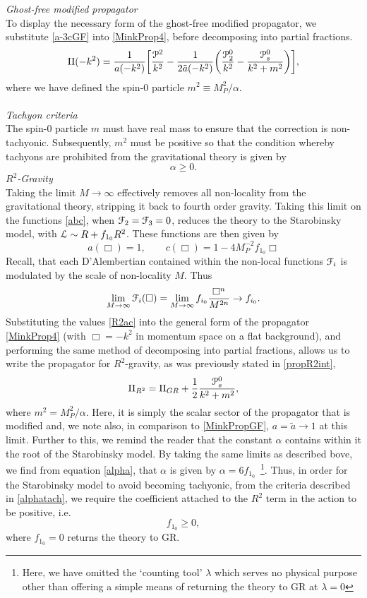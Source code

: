 \\\\
\emph{Ghost-free modified propagator}
\\
To display the necessary form of the ghost-free modified propagator, we substitute \eqref{a-3cGF} into \eqref{MinkProp4}, before decomposing into partial fractions.
\[
\label{MinkPropGF}
\Pi(-k^2)=\frac{1}{a(-k^2)}\biggl[\frac{{\cal P}^2}{k^2}-\frac{1}{2{\tilde a}(-k^2)}\biggl(\frac{{\cal P}_2^0}{k^2}-\frac{{\cal P}_s^0}{k^2+m^2}\biggr)\biggr]
,\]
where we have defined the spin-0 particle $m^2\equiv M_P^2/\alpha$. 
\pagebreak
\\\\\emph{Tachyon criteria}
\\
The spin-0 particle $m$ must have real mass to ensure that the correction is non-tachyonic. Subsequently, $m^2$ must be positive so that the condition whereby tachyons are prohibited from the gravitational theory is given by
\[
\label{alphatach}
\alpha\geq0
.\]
\emph{$R^2$-Gravity}
\\
Taking the limit $M\rightarrow\infty$ effectively removes all non-locality from the gravitational theory, stripping it back to fourth order gravity. Taking this limit on the functions \eqref{abc}, when ${\cal F}_2={\cal F}_3=0$, reduces the theory to the Starobinsky model, with ${\cal L}\sim R+f_{1_0} R^2$. These functions are then given by
\[
\label{R2ac}
a(\Box)=1, \qquad c(\Box)=1-4M_P^{-2}f_{1_0}\Box
\]
Recall, that each D'Alembertian contained within the non-local functions ${\cal F}_i$ is modulated by the scale of non-locality $M$. Thus
\[
\lim_{M\rightarrow\infty} {\cal F}_i(\Box)=\lim_{M\rightarrow\infty} f_{i_0}\frac{\Box^n}{M^{2n}}\rightarrow f_{i_0}
.\] 
Substituting the values \eqref{R2ac} into the general form of the propagator \eqref{MinkProp4} (with $\Box=-k^2$ in momentum space on a flat background), and performing the same method of decomposing into partial fractions, allows us to write the propagator for $R^2$-gravity, as was previously stated in \eqref{propR2int},
\[
\label{PropR2}
\Pi_{R^2}=\Pi_{GR}+\frac{1}{2}\frac{{\cal P}_s^0}{k^2+m^2}
,\]
where $m^2=M_P^2/\alpha$. Here, it is simply the scalar sector of the propagator that is modified and, we note also, in comparison to \eqref{MinkPropGF}, $a={\tilde a}\rightarrow 1$ at this limit. Further to this, we remind the reader that the constant $\alpha$ contains within it the root of the Starobinsky model. By taking the same limits as described bove, we find from equation \eqref{alpha}, that $\alpha$ is given by $\alpha=6f_{1_0}$~\footnote{Here, we have omitted the `counting tool' $\lambda$ which serves no physical purpose other than offering a simple means of returning the theory to GR at $\lambda=0$}. Thus, in order for the Starobinsky model to avoid becoming tachyonic, from the criteria described in \eqref{alphatach}, we require the coefficient attached to the $R^2$ term in the action to be positive, i.e.
\[
f_{1_0}\geq0
,\]
where $f_{1_0}=0$ returns the theory to GR.
